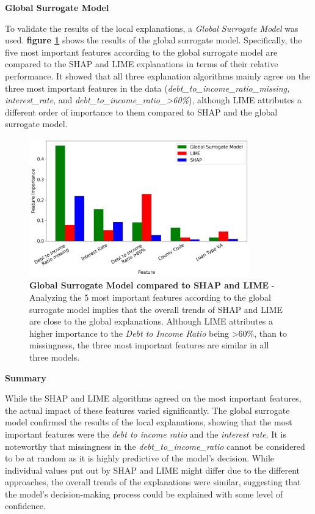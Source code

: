 \textbf{Global Surrogate Model}

To validate the results of the local explanations, a \textit{Global Surrogate Model} was used. \textbf{figure \ref{fig:Global_Surrogate}} shows the results of the global surrogate model. Specifically, the five most important features according to the global surrogate model are compared to the SHAP and LIME explanations in terms of their relative performance.
It showed that all three explanation algorithms mainly agree on the three most important features in the data (\textit{debt\_to\_income\_ratio\_missing, interest\_rate}, and \textit{debt\_to\_income\_ratio\_>60\%}), although LIME attributes a different order of importance to them compared to SHAP and the global surrogate model.

\begin{figure}[!htbp]
    \centering
    \includegraphics[width=0.85\textwidth]{images/CHXX_UPDATE_Surrogate_SHAP_LIME_combined.png}
    \caption[Global Surrogate Model compared to SHAP and LIME]{\textbf{Global Surrogate Model compared to SHAP and LIME} - Analyzing the 5 most important features according to the global surrogate model implies that the overall trends of SHAP and LIME are close to the global explanations. Although LIME attributes a higher importance to the \textit{Debt to Income Ratio} being >60\%, than to missingness, the three most important features are similar in all three models.}
    \label{fig:Global_Surrogate}
\end{figure}

\textbf{Summary}

While the SHAP and LIME algorithms agreed on the most important features, the actual impact of these features varied significantly. The global surrogate model confirmed the results of the local explanations, showing that the most important features were the \textit{debt to income ratio} and the \textit{interest rate}. 
It is noteworthy that missingness in the \textit{debt\_to\_income\_ratio} cannot be considered to be at random as it is highly predictive of the model's decision. 
While individual values put out by SHAP and LIME might differ due to the different approaches, the overall trends of the explanations were similar, suggesting that the model's decision-making process could be explained with some level of confidence.

